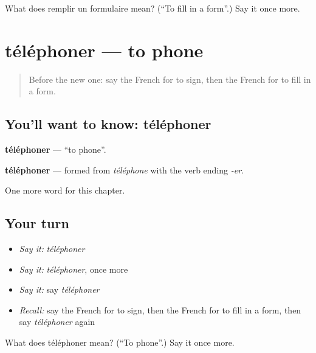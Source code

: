 \begin{tcolorbox}[breakable,colback=teal!4,colframe=teal!35!black,title={Before you move on}]
What does remplir un formulaire mean? (\textquotedblleft{}To fill in a form\textquotedblright{}.) Say it once more.
\end{tcolorbox}
\section[téléphoner]{téléphoner — to phone}

\label{lesson:FR-C145-telephoner}



\begin{quote}
Before the new one: say the French for to sign, then the French for to fill in a form.
\end{quote}

\subsection*{You'll want to know: téléphoner}
\textbf{téléphoner} — \textquotedblleft{}to phone\textquotedblright{}.

\begin{cousinweb}
\textbf{téléphoner} — formed from \emph{téléphone} with the verb ending \emph{-er}.
\end{cousinweb}

\begin{grammarlens}[title={What you've built}]
One more word for this chapter.
\end{grammarlens}

\subsection*{Your turn}
\begin{itemize}
\raggedright
  \item \emph{Say it:} \emph{téléphoner}
  \item \emph{Say it:} \emph{téléphoner}, once more
  \item \emph{Say it:} say \emph{téléphoner}
  \item \emph{Recall:} say the French for to sign, then the French for to fill in a form, then say \emph{téléphoner} again
\end{itemize}

\begin{tcolorbox}[breakable,colback=teal!4,colframe=teal!35!black,title={Before you move on}]
What does téléphoner mean? (\textquotedblleft{}To phone\textquotedblright{}.) Say it once more.
\end{tcolorbox}
